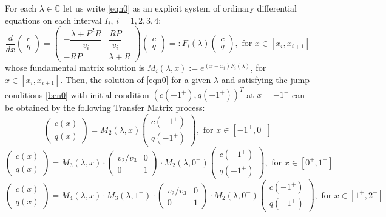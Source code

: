 \documentclass[a4paper]{article}
\def\C{{\mathbb{C}}}
\def\C{{\mathbb{C}}}
\numberwithin{equation}{section}
\begin{document}
For each $\lambda\in \C$ let us write \eqref{eqn0} as an explicit system of ordinary differential equations on each interval $I_i$, $i=1,2,3,4$:
\begin{equation}\label{eqn1v}
\dfrac{d}{dx}
\begin{pmatrix}
c\\q
\end{pmatrix}
=
\begin{pmatrix}
-\dfrac{\lambda+P^2R}{v_i}&\dfrac{RP}{v_i}\\-RP&\lambda+R
\end{pmatrix}
\begin{pmatrix}
c\\q
\end{pmatrix}=:F_i(\lambda)
\begin{pmatrix}
c\\q
\end{pmatrix},\text { for } x\in[x_i,x_{i+1}]
\end{equation}
whose fundamental matrix solution is $M_i(\lambda, x):=e^{(x-x_i) F_i(\lambda)}$,  for $x\in[x_i,x_{i+1}]$. Then, the solution of \eqref{eqn0} for a given $\lambda$ and satisfying the jump conditions \eqref{bcn0} with initial condition $(c(-1^+),q(-1^+))^T$ at $x=-1^+$ can be obtained by the following Transfer Matrix process:
$$\begin{pmatrix}
c(x)\\q(x)
\end{pmatrix}=M_2(\lambda,x)\begin{pmatrix}
c(-1^+)\\q(-1^+)
\end{pmatrix}, \text{ for }x\in[-1^+,0^-]$$
$$\begin{pmatrix}
c(x)\\q(x)
\end{pmatrix}=M_3(\lambda,x)\cdot\begin{pmatrix} v_2/v_3&0\\0&1\end{pmatrix}\cdot M_2(\lambda, 0^-)\begin{pmatrix}
c(-1^+)\\q(-1^+)
\end{pmatrix}, \text{ for }x\in[0^+,1^-]$$
$$\begin{pmatrix}
c(x)\\q(x)
\end{pmatrix}=M_4(\lambda,x)\cdot M_3(\lambda,1^-)\cdot\begin{pmatrix} v_2/v_3&0\\0&1\end{pmatrix}\cdot M_2(\lambda,0^-)\begin{pmatrix}
c(-1^+)\\q(-1^+)
\end{pmatrix}, \text{ for }x\in[1^+,2^-]$$
\end{document}
